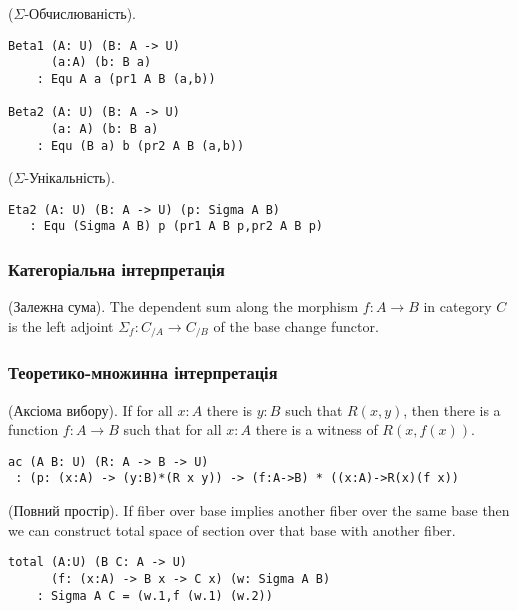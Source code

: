 \begin{theorem} ($\Sigma$-Обчислюваність).
\begin{lstlisting}
Beta1 (A: U) (B: A -> U)
      (a:A) (b: B a)
    : Equ A a (pr1 A B (a,b))

Beta2 (A: U) (B: A -> U)
      (a: A) (b: B a)
    : Equ (B a) b (pr2 A B (a,b))
\end{lstlisting}
\end{theorem}

\begin{theorem} ($\Sigma$-Унікальність).
\begin{lstlisting}
Eta2 (A: U) (B: A -> U) (p: Sigma A B)
   : Equ (Sigma A B) p (pr1 A B p,pr2 A B p)
\end{lstlisting}
\end{theorem}

\subsubsection{Категоріальна інтерпретація}

\begin{definition} (Залежна сума).
The dependent sum along the morphism $f: A \rightarrow B$ in category $C$ is the left
adjoint $\Sigma_f : C_{/A} \rightarrow C_{/B}$ of the base change functor.
\end{definition}

\subsubsection{Теоретико-множинна інтерпретація}

\begin{theorem} (Аксіома вибору).
If for all $x : A$ there is $y : B$ such that $R(x,y)$,
then there is a function $f : A \rightarrow B$
such that for all $x : A$ there is a witness of $R(x,f(x))$.
\begin{lstlisting}
ac (A B: U) (R: A -> B -> U)
 : (p: (x:A) -> (y:B)*(R x y)) -> (f:A->B) * ((x:A)->R(x)(f x))
\end{lstlisting}
\end{theorem}

\begin{theorem} (Повний простір).
If fiber over base implies another fiber
over the same base then we can construct total space of section
over that base with another fiber.
\begin{lstlisting}
total (A:U) (B C: A -> U)
      (f: (x:A) -> B x -> C x) (w: Sigma A B)
    : Sigma A C = (w.1,f (w.1) (w.2))
\end{lstlisting}
\end{theorem}

